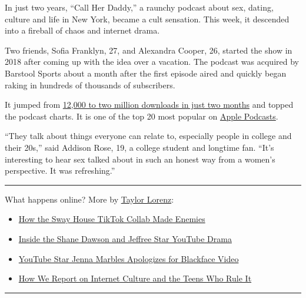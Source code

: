 In just two years, ``Call Her Daddy,'' a raunchy podcast about sex,
dating, culture and life in New York, became a cult sensation. This
week, it descended into a fireball of chaos and internet drama.

Two friends, Sofia Franklyn, 27, and Alexandra Cooper, 26, started the
show in 2018 after coming up with the idea over a vacation. The podcast
was acquired by Barstool Sports about a month after the first episode
aired and quickly began raking in hundreds of thousands of subscribers.

It jumped from
\href{https://www.adexchanger.com/publishers/influencers-are-the-new-publishers-barstool-sports-ceo-erika-nardini/}{12,000
to two million downloads in just two months} and topped the podcast
charts. It is one of the top 20 most popular on
\href{https://www.podcastinsights.com/top-us-podcasts/}{Apple Podcasts}.

``They talk about things everyone can relate to, especially people in
college and their 20s,'' said Addison Rose, 19, a college student and
longtime fan. ``It's interesting to hear sex talked about in such an
honest way from a women's perspective. It was refreshing.''

\begin{center}\rule{0.5\linewidth}{\linethickness}\end{center}

What happens online? More by
\href{https://www.nytimes3xbfgragh.onion/by/taylor-lorenz}{Taylor
Lorenz}:

\begin{itemize}
\item
  \href{https://www.nytimes3xbfgragh.onion/2020/06/08/style/sway-house-neighbors-tiktok.html}{How
  the Sway House TikTok Collab Made Enemies}
\item
  \href{https://www.nytimes3xbfgragh.onion/2020/06/29/style/shane-dawson-jeffree-star-youtube.html}{Inside
  the Shane Dawson and Jeffree Star YouTube Drama}
\item
  \href{https://www.nytimes3xbfgragh.onion/2020/06/26/us/jenna-marbles-leaves-youtube.html}{YouTube
  Star Jenna Marbles Apologizes for Blackface Video}
\item
  \href{https://www.nytimes3xbfgragh.onion/2020/07/16/style/taylor-lorenz-internet-culture-reporting.html}{How
  We Report on Internet Culture and the Teens Who Rule It}
\end{itemize}

\begin{center}\rule{0.5\linewidth}{\linethickness}\end{center}

